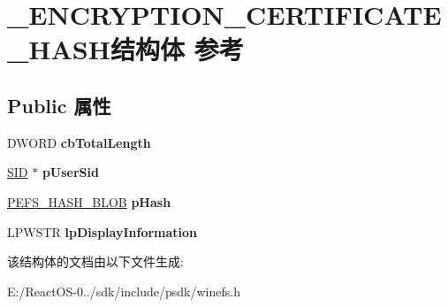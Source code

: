 \hypertarget{struct___e_n_c_r_y_p_t_i_o_n___c_e_r_t_i_f_i_c_a_t_e___h_a_s_h}{}\section{\+\_\+\+E\+N\+C\+R\+Y\+P\+T\+I\+O\+N\+\_\+\+C\+E\+R\+T\+I\+F\+I\+C\+A\+T\+E\+\_\+\+H\+A\+S\+H结构体 参考}
\label{struct___e_n_c_r_y_p_t_i_o_n___c_e_r_t_i_f_i_c_a_t_e___h_a_s_h}
\subsection*{Public 属性}
\begin{DoxyCompactItemize}
\item 
\mbox{\label{struct___e_n_c_r_y_p_t_i_o_n___c_e_r_t_i_f_i_c_a_t_e___h_a_s_h_ad1c078e8dfb36393e8eaeacbf5e1fc3c}} 
D\+W\+O\+RD {\bfseries cb\+Total\+Length}
\item 
\mbox{\label{struct___e_n_c_r_y_p_t_i_o_n___c_e_r_t_i_f_i_c_a_t_e___h_a_s_h_a44acd56524334d07947a839068d4d674}} 
\hyperlink{struct___s_i_d}{S\+ID} $\ast$ {\bfseries p\+User\+Sid}
\item 
\mbox{\label{struct___e_n_c_r_y_p_t_i_o_n___c_e_r_t_i_f_i_c_a_t_e___h_a_s_h_a5ca7dd4305acd77435d00b57be848e7c}} 
\hyperlink{struct___e_f_s___h_a_s_h___b_l_o_b}{P\+E\+F\+S\+\_\+\+H\+A\+S\+H\+\_\+\+B\+L\+OB} {\bfseries p\+Hash}
\item 
\mbox{\label{struct___e_n_c_r_y_p_t_i_o_n___c_e_r_t_i_f_i_c_a_t_e___h_a_s_h_af6128b4ad76b1b4aa809b1843c101377}} 
L\+P\+W\+S\+TR {\bfseries lp\+Display\+Information}
\end{DoxyCompactItemize}


该结构体的文档由以下文件生成\+:\begin{DoxyCompactItemize}
\item 
E\+:/\+React\+O\+S-\/0../sdk/include/psdk/winefs.\+h\end{DoxyCompactItemize}
